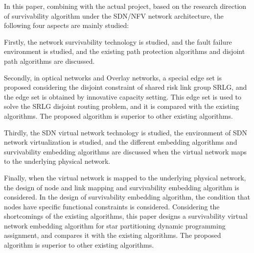 {In this paper, combining with the actual project, based on the research direction of survivability algorithm under the SDN/NFV network architecture, the following four aspects are mainly studied:

Firstly, the network survivability technology is studied, and the fault failure environment is studied, and the existing path protection algorithms and disjoint path algorithms are discussed.

Secondly, in optical networks and Overlay networks, a special edge set is proposed considering the disjoint constraint of shared risk link group SRLG, and the edge set is obtained by innovative capacity setting. This edge set is used to solve the SRLG disjoint routing problem, and it is compared with the existing algorithms. The proposed algorithm is superior to other existing algorithms.

Thirdly, the SDN virtual network technology is studied, the environment of SDN network virtualization is studied, and the different embedding algorithms and survivability embedding algorithms are discussed when the virtual network maps to the underlying physical network.

Finally, when the virtual network is mapped to the underlying physical network, the design of node and link mapping and survivability embedding algorithm is considered. In the design of survivability embedding algorithm, the condition that nodes have specific functional constraints is considered. Considering the shortcomings of the existing algorithms, this paper designs a survivability virtual network embedding algorithm for star partitioning dynamic programming assignment, and compares it with the existing algorithms. The proposed algorithm is superior to other existing algorithms.

}
\makecover
\clearpage

